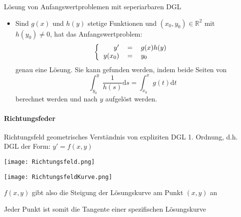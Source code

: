 \begin{KR}{Lösung von Anfangswertproblemen mit seperiarbaren DGL}
  \begin{itemize}
    \item Sind \(g(x)\) und \(h(y)\) stetige Funktionen und \((x_0,y_0)\in \mathbb{R}^2\) mit \(h(y_0)\neq 0\), hat das
      Anfangswertproblem:
      \[\left\{\begin{tabular}{rcl}
	  \(y'\)&\(=\)&\(g(x)h(y)\)\\
	  \(y(x_0)\)&\(=\)&\(y_0\)\\
      \end{tabular}\right.\]
      genau eine Lösung. Sie kann gefunden werden, indem beide Seiten von 
      \[\int_{y_0}^{y}{\frac{1}{h(s)}\mathrm{d}s}=\int_{x_0}^{x}{g(t)\mathrm{d}t}\]
      berechnet werden und nach \(y\) aufgelöst werden.
  \end{itemize}
\end{KR}

\paragraph{Richtungsfeder}
\begin{definition}{Richtungsfeld} geometrisches Verständnis von expliziten DGL 1. Ordnung, d.h. DGL der Form:
  $y'=f(x,y)$
  \begin{minipage}{0.45\linewidth}
    \begin{center}
    \texttt{[image: Richtungsfeld.png]}
    \end{center}
  \end{minipage}
  \hspace{3mm}
  \begin{minipage}{0.45\linewidth}
    \begin{center}
    \texttt{[image: RichtungsfeldKurve.png]}
    \end{center}
  \end{minipage}

  \begin{minipage}{0.45\linewidth}
    \(f(x,y)\) gibt also die Steigung der Lösungskurve am Punkt \((x,y)\) an
  \end{minipage}
  \hspace{3mm}
  \begin{minipage}{0.45\linewidth}
    Jeder Punkt ist somit die Tangente einer spezifischen Lösungskurve
  \end{minipage}
\end{definition}

